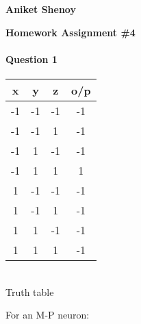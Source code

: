 \documentclass[12pt]{article}
\begin{document}
\textbf{Aniket Shenoy} 

\begin{center}
\large
\textbf{Homework Assignment \#4}
\end{center}

\paragraph{Question 1}
\begin{center}
    \begin{tabular}{| c | c | c | c |}
    \hline
    \textbf{x} & \textbf{y} & \textbf{z} & \textbf{o/p} \\ \hline
    -1 & -1 & -1 & -1 \\ \hline
    -1 & -1 & 1 & -1 \\ \hline
    -1 & 1 & -1 & -1 \\ \hline
    -1 & 1 & 1 & 1 \\ \hline
    1 & -1 & -1 & -1 \\ \hline
    1 & -1 & 1 & -1 \\ \hline
    1 & 1 & -1 & -1 \\ \hline
    1 & 1 & 1 & -1 \\ \hline
    \end{tabular} \\
    \bigskip
    Truth table
\end{center}
For an M-P neuron:
\end{document}
